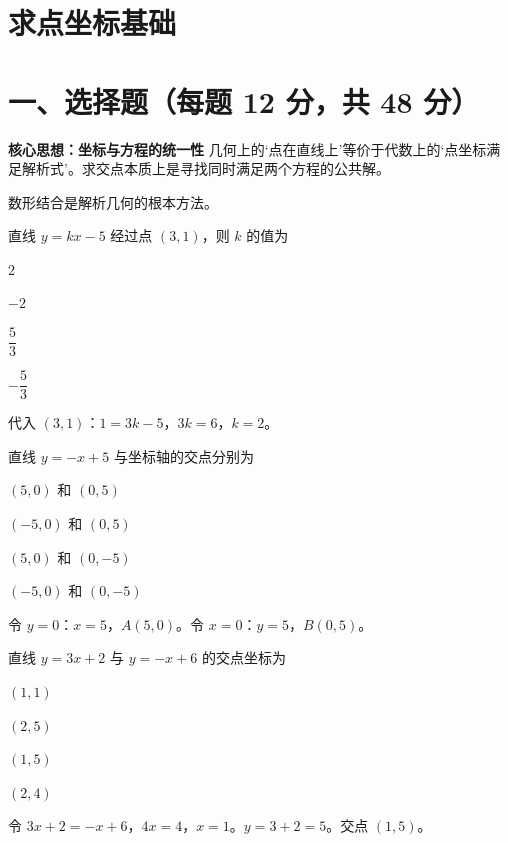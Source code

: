 \documentclass{exam-zh}
\begin{document}
\section*{求点坐标基础}

\section*{一、选择题（每题 12 分，共 48 分）}



\begin{keyideabox}
  \textbf{核心思想：坐标与方程的统一性}
  几何上的‘点在直线上’等价于代数上的‘点坐标满足解析式’。求交点本质上是寻找同时满足两个方程的公共解。
\par\small 数形结合是解析几何的根本方法。\end{keyideabox}



\begin{question}[points=12]
  直线 $y = kx - 5$ 经过点 $(3, 1)$，则 $k$ 的值为
  \begin{choices}
    \item $2$
    \item $-2$
    \item $\dfrac{5}{3}$
    \item $-\dfrac{5}{3}$
  \end{choices}
  \paren[A]
  \begin{solutionblock}
    代入 $(3, 1)$：$1=3k-5$，$3k=6$，$k=2$。
  \end{solutionblock}
\end{question}



\begin{question}[points=12]
  直线 $y = -x + 5$ 与坐标轴的交点分别为
  \begin{choices}
    \item $(5, 0)$ 和 $(0, 5)$
    \item $(-5, 0)$ 和 $(0, 5)$
    \item $(5, 0)$ 和 $(0, -5)$
    \item $(-5, 0)$ 和 $(0, -5)$
  \end{choices}
  \paren[A]
  \begin{solutionblock}
    令 $y=0$：$x=5$，$A(5,0)$。令 $x=0$：$y=5$，$B(0,5)$。
  \end{solutionblock}
\end{question}



\begin{question}[points=12]
  直线 $y = 3x + 2$ 与 $y = -x + 6$ 的交点坐标为
  \begin{choices}
    \item $(1, 1)$
    \item $(2, 5)$
    \item $(1, 5)$
    \item $(2, 4)$
  \end{choices}
  \paren[C]
  \begin{solutionblock}
    令 $3x+2=-x+6$，$4x=4$，$x=1$。$y=3+2=5$。交点 $(1, 5)$。
  \end{solutionblock}
\end{question}
\end{document}
